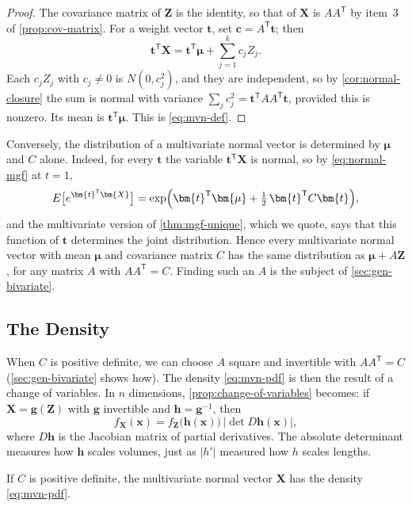 \begin{proof}
	The covariance matrix of $\bm{Z}$ is the identity, so that of $\bm{X}$ is $AA^{\mathsf{T}}$ by item~3 of \autoref{prop:cov-matrix}.
	For a weight vector $\bm{t}$, set $\bm{c}=A^{\mathsf{T}}\bm{t}$; then
	\[
		\bm{t}^{\mathsf{T}}\bm{X}=\bm{t}^{\mathsf{T}}\bm{\mu}+\sum_{j=1}^{k}c_{j}Z_{j} .
	\]
	Each $c_{j}Z_{j}$ with $c_{j}\ne0$ is $N(0,c_{j}^{2})$, and they are independent, so by \autoref{cor:normal-closure} the sum is normal with variance $\sum_{j}c_{j}^{2}=\bm{t}^{\mathsf{T}}AA^{\mathsf{T}}\bm{t}$, provided this is nonzero.
	Its mean is $\bm{t}^{\mathsf{T}}\bm{\mu}$.
	This is \eqref{eq:mvn-def}.
\end{proof}

Conversely, the distribution of a multivariate normal vector is determined by $\bm{\mu}$ and $C$ alone.
Indeed, for every $\bm{t}$ the variable $\bm{t}^{\mathsf{T}}\bm{X}$ is normal, so by \eqref{eq:normal-mgf} at $t=1$,
\[
	E\bigl[e^{\bm{t}^{\mathsf{T}}\bm{X}}\bigr]=\exp\Bigl(\bm{t}^{\mathsf{T}}\bm{\mu}+\tfrac12\,\bm{t}^{\mathsf{T}}C\bm{t}\Bigr) ,
\]
and the multivariate version of \autoref{thm:mgf-unique}, which we quote, says that this function of $\bm{t}$ determines the joint distribution.
Hence every multivariate normal vector with mean $\bm{\mu}$ and covariance matrix $C$ has the same distribution as $\bm{\mu}+A\bm{Z}$, for any matrix $A$ with $AA^{\mathsf{T}}=C$.
Finding such an $A$ is the subject of \autoref{sec:gen-bivariate}.

\subsection{The Density}

When $C$ is positive definite, we can choose $A$ square and invertible with $AA^{\mathsf{T}}=C$ (\autoref{sec:gen-bivariate} shows how).
The density \eqref{eq:mvn-pdf} is then the result of a change of variables.
In $n$ dimensions, \autoref{prop:change-of-variables} becomes: if $\bm{X}=\bm{g}(\bm{Z})$ with $\bm{g}$ invertible and $\bm{h}=\bm{g}^{-1}$, then
\[
	f_{\bm{X}}(\bm{x})=f_{\bm{Z}}\bigl(\bm{h}(\bm{x})\bigr)\,\bigl|\det D\bm{h}(\bm{x})\bigr| ,
\]
where $D\bm{h}$ is the Jacobian matrix of partial derivatives.
The absolute determinant measures how $\bm{h}$ scales volumes, just as $|h'|$ measured how $h$ scales lengths.

\begin{proposition}
	If $C$ is positive definite, the multivariate normal vector $\bm{X}$ has the density \eqref{eq:mvn-pdf}.
\end{proposition}

